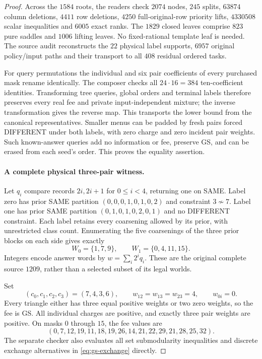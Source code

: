 \begin{proof}
Across the $1584$ roots, the readers check $2074$ nodes, $245$
splits, $63874$ column deletions, $4411$ row deletions, $4250$
full-original-row priority lifts, $4330508$ scalar inequalities
and $6005$ exact ranks. The $1829$ closed leaves comprise $823$
pure saddles and $1006$ lifting leaves. No fixed-rational template
leaf is needed. The source audit reconstructs the $22$ physical
label supports, $6957$ original policy/input paths and their
transport to all $408$ residual ordered tasks.

For query permutations the individual and six pair coefficients
of every purchased mask rename identically. The composer checks
all $24\cdot16=384$ ten-coefficient identities. Transforming
tree queries, global orders and terminal labels therefore
preserves every real fee and private input-independent mixture;
the inverse transformation gives the reverse map. This transports
the lower bound from the canonical representatives. Smaller menus
can be padded by fresh pairs forced DIFFERENT under both labels,
with zero charge and zero incident pair weights. Such known-answer
queries add no information or fee, preserve GS, and can be erased
from each seed's order. This proves the equality assertion.

\paragraph*{A complete physical three-pair witness.}
Let $q_i$ compare records $2i,2i+1$ for $0\leq i<4$, returning one
on SAME. Label zero has prior SAME partition
$(0,0,0,1,0,1,0,2)$ and constraint $3\not\sim7$.
Label one has prior SAME partition $(0,1,0,1,0,2,0,1)$ and no
DIFFERENT constraint. Each label retains every coarsening allowed
by its prior, with unrestricted class count. Enumerating the five
coarsenings of the three prior blocks on each side gives exactly
\[
 W_0=\{1,7,9\},\qquad W_1=\{0,4,11,15\}.
\]
Integers encode answer words by $w=\sum_i2^i q_i$.
These are the original complete source $1209$, rather than a
selected subset of its legal worlds.

Set
\[
 (c_0,c_1,c_2,c_3)=(7,4,3,6),\qquad
 w_{12}=w_{13}=w_{23}=4,\qquad w_{0i}=0.
\]
Every triangle either has three equal positive weights or two zero
weights, so the fee is GS. All individual charges are positive,
and exactly three pair weights are positive. On masks $0$ through
$15$, the fee values are
\[
 (0,7,12,19,11,18,19,26,14,21,22,29,21,28,25,32).
\]
The separate checker also evaluates all set submodularity
inequalities and discrete exchange alternatives in
\eqref{eq:gs-exchange} directly.


\end{proof}
